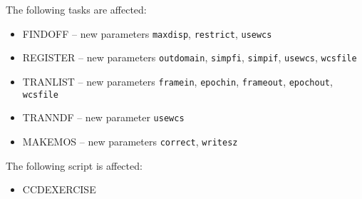 \documentclass[twoside,11pt]{article}
\newcommand{\htmlref}[2]{#1}
\renewcommand{\_}{\texttt{\symbol{95}}}
\newcommand{\text}[1]{{\small \tt #1}}
\newcommand{\xroutine}[1]{\htmlref{{\sc #1}}{#1}}
\begin{document}
\begin{itemize}
\begin{itemize}
    The following tasks are affected:
       \begin{itemize}
       \item \xroutine{FINDOFF} --   new parameters 
          \text{maxdisp}, \text{restrict}, \text{usewcs}
       \item \xroutine{REGISTER} --  new parameters 
          \text{outdomain}, \text{simpfi}, \text{simpif}, \text{usewcs},
          \text{wcsfile}
       \item \xroutine{TRANLIST} --  new parameters 
          \text{framein}, \text{epochin}, \text{frameout}, 
          \text{epochout}, \text{wcsfile}
       \item \xroutine{TRANNDF} --   new parameter  
          \text{usewcs}
       \item \xroutine{MAKEMOS} --   new parameters 
          \text{correct}, \text{writesz}
       \end{itemize}
    The following script is affected:
       \begin{itemize}
       \item \xroutine{CCDEXERCISE}
       \end{itemize}


\end{itemize}
\end{itemize}
\end{document}
